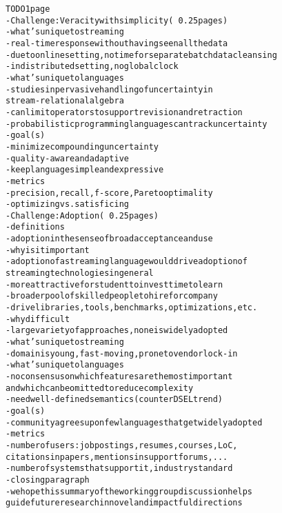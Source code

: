 \begin{alltt}TODO\scriptsize 1 page
- Challenge: Veracity with simplicity (~0.25 pages)
  - what's unique to streaming
    - real-time response without having seen all the data
    - due to online setting, no time for separate batch data cleansing
    - in distributed setting, no global clock~\cite{lamport_1978}
  - what's unique to languages
    - studies in pervasive handling of uncertainty in
      stream-relational algebra \cite{ali_et_al_2009} \cite{tran_et_al_2010}
    - can limit operators to support revision and retraction
    - probabilistic programming languages can track uncertainty~\cite{gordon_et_al_2014}
  - goal(s)
    - minimize compounding uncertainty
    - quality-aware and adaptive
    - keep language simple and expressive
  - metrics
    - precision, recall, f-score, Pareto optimality
    - optimizing vs. satisficing
- Challenge: Adoption (~0.25 pages)
  - definitions
    - adoption in the sense of broad acceptance and use
  - why is it important
    - adoption of a streaming language would drive adoption of
      streaming technologies in general
    - more attractive for student to invest time to learn
    - broader pool of skilled people to hire for company
    - drive libraries, tools, benchmarks, optimizations, etc.
  - why difficult
    - large variety of approaches, none is widely adopted
  - what's unique to streaming
    - domain is young, fast-moving, prone to vendor lock-in
  - what's unique to languages
    - no consensus on which features are the most important
      and which can be omitted to reduce complexity
    - need well-defined semantics (counter DSEL trend)
  - goal(s)
    - community agrees upon few languages that get widely adopted
  - metrics
    - number of users: job postings, resumes, courses, LoC,
      citations in papers, mentions in support forums, ...
    - number of systems that support it, industry standard
- closing paragraph
  - we hope this summary of the working group discussion helps
    guide future research in novel and impactful directions
\end{alltt}
